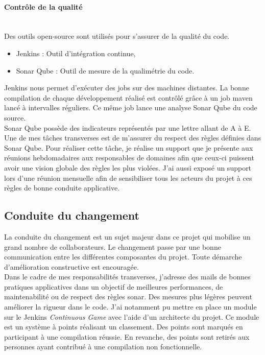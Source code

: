 \documentclass[12pt,a4paper]{article}
\begin{document}
\paragraph{Contrôle de la qualité}
~~\\
Des outils open-source sont utilisés pour s'assurer de la qualité du code. 
\begin{itemize}
\item Jenkins : Outil d'intégration continue,
\item Sonar Qube : Outil de mesure de la qualimétrie du code.
\end{itemize}
Jenkins nous permet d'exécuter des jobs sur des machines distantes. La bonne compilation de chaque développement réalisé est contrôlé grâce à un job maven lancé à intervalles réguliers. Ce même job lance une analyse Sonar Qube du code source.\\
Sonar Qube possède des indicateurs représentés par une lettre allant de A à E. Une de mes tâches transverses est de m'assurer du respect des règles définies dans Sonar Qube. Pour réaliser cette tâche, je réalise un support que je présente aux réunions hebdomadaires aux responsables de domaines afin que ceux-ci puissent avoir une vision globale des règles les plus violées. J'ai aussi exposé un support lors d'une réunion mensuelle afin de sensibiliser tous les acteurs du projet à ces règles de bonne conduite applicative.
\subsection{Conduite du changement}
La conduite du changement est un sujet majeur dans ce projet qui mobilise un grand nombre de collaborateurs. Le changement passe par une bonne communication entre les différentes composantes du projet. Toute démarche d'amélioration constructive est encouragée.\\
Dans le cadre de mes responsabilités transverses, j'adresse des mails de bonnes pratiques applicatives dans un objectif de meilleures performances, de maintenabilité ou de respect des règles sonar.
Des mesures plus légères peuvent améliorer la rigueur dans le code. J'ai notamment pu mettre en place un module sur le Jenkins \emph{Continuous Game} avec l'aide d'un architecte du projet. Ce module est un système à points réalisant un classement. Des points sont marqués en participant à une compilation réussie. En revanche, des points sont retirés aux personnes ayant contribué à une compilation non fonctionnelle.
\clearpage
\newpage
\end{document}
